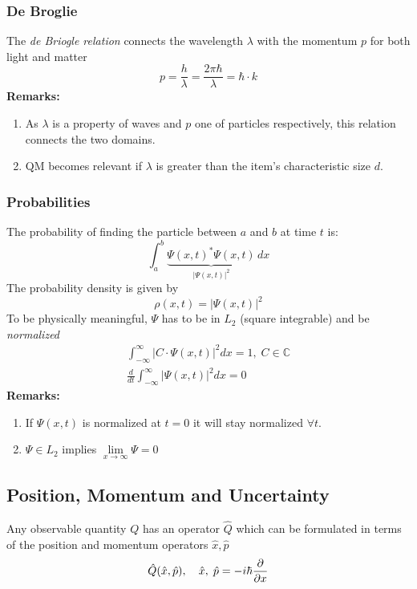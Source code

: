 \subsubsection{De Broglie}
The \textit{de Briogle relation} connects the wavelength $\lambda$ with the momentum $p$ for both light and matter
\begin{equation*}
    p=\frac{h}{\lambda}=\frac{2\pi\hbar}{\lambda}=\hbar\cdot k
\end{equation*}
\textbf{Remarks:}
\begin{enumerate}
    \item As $\lambda$ is a property of waves and $p$ one of particles respectively, this relation connects the two domains.
    \item QM becomes relevant if $\lambda$ is greater than the item's characteristic size $d$.
\end{enumerate}

\subsubsection{Probabilities}
The probability of finding the particle between $a$ and $b$ at time $t$ is:
\begin{equation*}
    \int_a^b \underbrace{{\Psi(x,t)}^*\Psi(x,t)}_{|\Psi(x,t)|^2}\,dx
\end{equation*}
The probability density is given by
\begin{equation*}
    \rho(x,t) = |\Psi(x,t)|^2
\end{equation*}
To be physically meaningful, $\Psi$ has to be in $L_2$ (square integrable) and be \textit{normalized}
\begin{align*}
    \int_{-\infty}^{\infty} |C\cdot \Psi(x,t)|^2 dx = 1, \; C\in\mathbb{C} \\
    \frac{d}{dt}\int_{-\infty}^{\infty} |\Psi(x,t)|^2 dx = 0
\end{align*}
\textbf{Remarks:}
\begin{enumerate}
    \item If $\Psi(x,t)$ is normalized at $t=0$ it will stay normalized $\forall t$.
    \item $\Psi \in L_2$ implies $\lim \limits_{x \to \infty}\Psi=0$
\end{enumerate}


\subsection{Position, Momentum and Uncertainty}
Any observable quantity $Q$ has an operator $\hat{Q}$ which can be formulated in terms of the position and momentum operators $\hat{x}, \hat{p}$
\begin{equation*}
    \hat{Q}(\hat{x},\hat{p}), \hspace*{10pt} \hat{x},\; \hat{p}=-i\hbar \frac{\partial}{\partial x}
\end{equation*}


